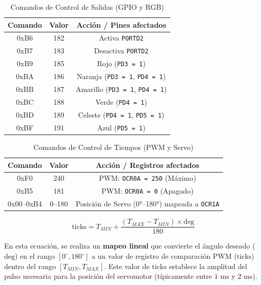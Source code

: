 \begin{table}[H]
\centering
\caption{Comandos de Control de Salidas (GPIO y RGB)}
\begin{tabular}{@{}ccc@{}}
\toprule
\textbf{Comando} & \textbf{Valor} & \textbf{Acción / Pines afectados} \\ \midrule

0xB6 & 182 & Activa \texttt{PORTD2} \\ 
0xB7 & 183 & Desactiva \texttt{PORTD2} \\ \midrule

0xB9 & 185 & Rojo (\texttt{PD3 = 1}) \\
0xBA & 186 & Naranja (\texttt{PD3 = 1}, \texttt{PD4 = 1}) \\
0xBB & 187 & Amarillo (\texttt{PD3 = 1}, \texttt{PD4 = 1}) \\
0xBC & 188 & Verde (\texttt{PD4 = 1}) \\
0xBD & 189 & Celeste (\texttt{PD4 = 1}, \texttt{PD5 = 1}) \\
0xBF & 191 & Azul (\texttt{PD5 = 1}) \\

\bottomrule
\end{tabular}
\label{tab:tabspi}
\end{table}


\begin{table}[H]
\centering
\caption{Comandos de Control de Tiempos (PWM y Servo)}
\begin{tabular}{@{}ccc@{}}
\toprule
\textbf{Comando} & \textbf{Valor} & \textbf{Acción / Registros afectados} \\ \midrule

0xF0 & 240 & PWM: \texttt{OCR0A = 250} (Máximo) \\
0xB5 & 181 & PWM: \texttt{OCR0A = 0} (Apagado) \\ \midrule

0x00–0xB4 & 0–180 & Posición de Servo (0°–180°) mapeada a \texttt{OCR1A} \\

\bottomrule
\end{tabular}
\label{tab:tabspi2}
\end{table}


\begin{equation} 
\text{ticks} = T_{MIN} + \frac{(T_{MAX} - T_{MIN}) \times \text{deg}}{180}
\end{equation}

En esta ecuación, se realiza un \textbf{mapeo lineal} que convierte el ángulo deseado ($\text{deg}$) en el rango $[0^\circ, 180^\circ]$ a un valor de registro de comparación PWM ($\text{ticks}$) dentro del rango $[T_{MIN}, T_{MAX}]$. Este valor de $\text{ticks}$ establece la amplitud del pulso necesaria para la posición del servomotor (típicamente entre $1 \text{ ms}$ y $2 \text{ ms}$).

